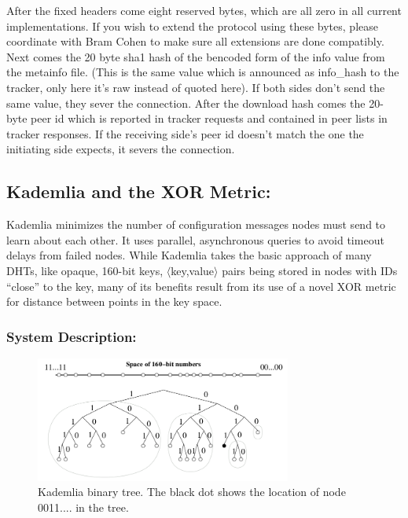 \documentclass[a4paper,12pt]{article}
\begin{document}
After the fixed headers come eight reserved bytes, which are all zero in all current implementations. If you wish to extend the protocol using these bytes, please coordinate with Bram Cohen to make sure all extensions are done compatibly. Next comes the 20 byte sha1 hash of the bencoded form of the info value from the metainfo file. (This is the same value which is announced as info{\_}hash to the tracker, only here it's raw instead of quoted here). If both sides don't send the same value, they sever the connection. After the download hash comes the 20-byte peer id which is reported in tracker requests and contained in peer lists in tracker responses. If the receiving side's peer id doesn't match the one the initiating side expects, it severs the connection.


\subsection{Kademlia and the XOR Metric:}

Kademlia minimizes the number of configuration messages nodes must send to learn about each other. It uses parallel, asynchronous queries to avoid timeout delays from failed nodes. While Kademlia takes the basic approach of many DHTs, like opaque, 160-bit keys, $\langle$key,value$\rangle$ pairs being stored in nodes with IDs ``close'' to the key, many of its benefits result from its use of a novel XOR metric for distance between points in the key space.

\subsubsection{System Description:}

\begin{figure}[H]
\centering
\includegraphics[width=0.75\textwidth]{./img/kadem-1.png}
\caption{\label{fig:kadem-1} Kademlia binary tree. The black dot shows the location of node 0011.... in the tree.}
\end{figure}
\end{document}
